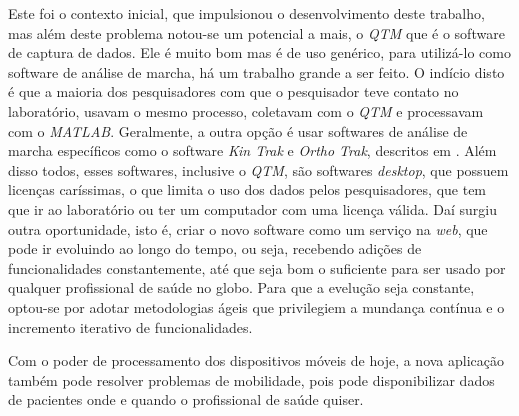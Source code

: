 Este foi o contexto inicial, que impulsionou o desenvolvimento deste trabalho,
mas além deste problema notou-se um potencial a mais, o \emph{QTM} que é o software 
de captura de dados. Ele é muito bom mas é de uso genérico, para utilizá-lo como 
software de análise de marcha, há um trabalho grande a ser feito. O indício disto é 
que a maioria dos pesquisadores com que o pesquisador teve contato no laboratório, 
usavam o mesmo processo, coletavam com o \emph{QTM} e processavam com o \emph{MATLAB}. 
Geralmente, a outra opção é usar softwares de análise de marcha específicos como 
o software \emph{Kin Trak} e \emph{Ortho Trak}, descritos em . Além disso todos, esses softwares, inclusive o
\emph{QTM}, são softwares \emph{desktop}, que possuem licenças caríssimas, o que limita o
uso dos dados pelos pesquisadores, que tem que ir ao laboratório ou ter um computador
com uma licença válida. Daí surgiu outra oportunidade, isto é, criar o novo software 
como um serviço na \emph{web}, que pode ir evoluindo ao longo do tempo, ou seja,
recebendo adições de funcionalidades constantemente, até que seja bom o suficiente
para ser usado por qualquer profissional de saúde no globo.
Para que a evelução seja constante, optou-se por adotar metodologias ágeis que privilegiem a mundança contínua e o incremento iterativo de funcionalidades.

Com o poder de processamento dos dispositivos móveis de hoje, a nova
aplicação também pode resolver problemas de mobilidade, pois pode disponibilizar dados de pacientes
onde e quando o profissional de saúde quiser.

